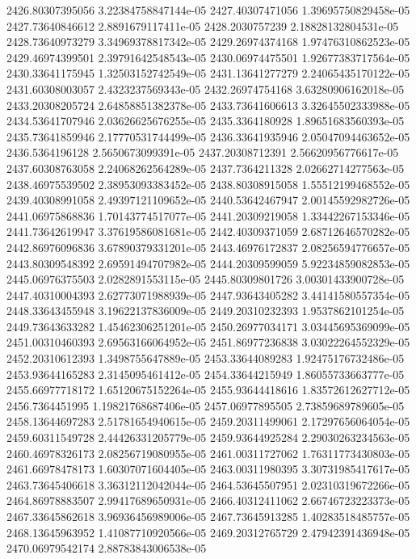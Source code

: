 {2426.80307395056 3.22384758847144e-05
2427.40307471056 1.39695750829458e-05
2427.73640846612 2.8891679117411e-05
2428.2030757239 2.18828132804531e-05
2428.73640973279 3.34969378817342e-05
2429.26974374168 1.97476310862523e-05
2429.46974399501 2.39791642548543e-05
2430.06974475501 1.92677383717564e-05
2430.33641175945 1.32503152742549e-05
2431.13641277279 2.24065435170122e-05
2431.60308003057 2.4323237569343e-05
2432.26974754168 3.63280906162018e-05
2433.20308205724 2.64858851382378e-05
2433.73641606613 3.32645502333988e-05
2434.53641707946 2.03626625676255e-05
2435.3364180928 1.89651683560393e-05
2435.73641859946 2.17770531744499e-05
2436.33641935946 2.05047094463652e-05
2436.5364196128 2.5650673099391e-05
2437.20308712391 2.56620956776617e-05
2437.60308763058 2.24068262564289e-05
2437.7364211328 2.02662714277563e-05
2438.46975539502 2.38953093383452e-05
2438.80308915058 1.55512199468552e-05
2439.40308991058 2.49397121109652e-05
2440.53642467947 2.00145592982726e-05
2441.06975868836 1.70143774517077e-05
2441.20309219058 1.33442267153346e-05
2441.73642619947 3.37619586081681e-05
2442.40309371059 2.68712646570282e-05
2442.86976096836 3.67890379331201e-05
2443.46976172837 2.08256594776657e-05
2443.80309548392 2.69591494707982e-05
2444.20309599059 5.92234859082853e-05
2445.06976375503 2.0282891553115e-05
2445.80309801726 3.00301433900728e-05
2447.40310004393 2.62773071988939e-05
2447.93643405282 3.44141580557354e-05
2448.33643455948 3.19622137836009e-05
2449.20310232393 1.9537862101254e-05
2449.73643633282 1.45462306251201e-05
2450.26977034171 3.03445695369099e-05
2451.00310460393 2.69563166064952e-05
2451.86977236838 3.03022264552329e-05
2452.20310612393 1.3498755647889e-05
2453.33644089283 1.92475176732486e-05
2453.93644165283 2.3145095461412e-05
2454.33644215949 1.86055733663777e-05
2455.66977718172 1.65120675152264e-05
2455.93644418616 1.83572612627712e-05
2456.7364451995 1.19821768687406e-05
2457.06977895505 2.73859689789605e-05
2458.13644697283 2.51781654940615e-05
2459.20311499061 2.17297656064054e-05
2459.60311549728 2.44426331205779e-05
2459.93644925284 2.29030263234563e-05
2460.46978326173 2.08256719080955e-05
2461.00311727062 1.76311773430803e-05
2461.66978478173 1.60307071604405e-05
2463.00311980395 3.30731985417617e-05
2463.73645406618 3.36312112042044e-05
2464.53645507951 2.02310319672266e-05
2464.86978883507 2.99417689650931e-05
2466.40312411062 2.66746723223373e-05
2467.33645862618 3.96936456989006e-05
2467.73645913285 1.40283518485757e-05
2468.13645963952 1.41087710920566e-05
2469.20312765729 2.47942391436948e-05
2470.06979542174 2.88783843006538e-05
}
